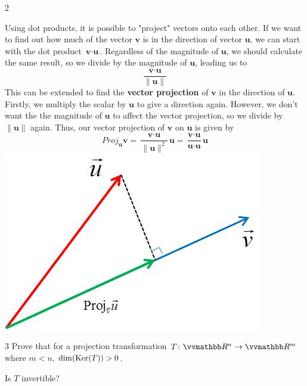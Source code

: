 \documentclass[11pt,fleqn]{article}
\begin{document}
\begin{center}
\begin{exr}{}{2}
\end{exr}

\begin{tcolorbox}[title={\fontsize{13pt}{13pt}\selectfont Projection}, enforce breakable, pad at break=4mm, colframe=darkcrimson!100,colback=black!1,width=.9\linewidth,sharp corners=north]\fontsize{11.5pt}{12pt}\selectfont 

Using dot products, it is possible to "project" vectors onto each other. If we want to find out how much of the vector $\textbf{v}$ is in the direction of vector $\textbf{u}$, we can start with the dot product $\textbf{v} \cdot \textbf{u}$. Regardless of the magnitude of $\textbf{u}$, we should calculate the same result, so we divide by the magnitude of $\textbf{u}$, leading us to
$$
\frac{\textbf{v} \cdot \textbf{u}}{\|\textbf{u}\|}
$$
This can be extended to find the \textbf{vector projection} of $\textbf{v}$ in the direction of $\textbf{u}$. Firstly, we multiply the scalar by $\textbf{u}$ to give a direction again. However, we don't want the the magnitude of $\textbf{u}$ to affect the vector projection, so we divide by $\|\textbf{u}\|$ again. Thus, our vector projection of $\textbf{v}$ on $\textbf{u}$ is given by
$$
\textit{Proj} _{\textbf{u}} \textbf{v} = \frac{\textbf{v} \cdot \textbf{u}}{\|\textbf{u}\|^2}\textbf{u} = \frac{\textbf{v} \cdot \textbf{u}}{\textbf{u} \cdot \textbf{u}}\textbf{u}
$$
\includegraphics{projection1.png}

\end{tcolorbox}

\begin{exr}{}{3}
Prove that for a projection transformation $T \colon \R^n \rightarrow \R^m$ where $m<n$, $\dim (\operatorname{Ker} (T)) > 0$. \blni

\begin{rmk} 
Is $T$ invertible?
\end{rmk}
\end{exr}

\end{center}
\end{document}

